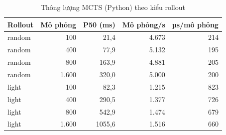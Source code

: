 \begin{table}[H]
  \centering
  \small
  \caption{Thông lượng MCTS (Python) theo kiểu rollout}
  \label{tab:cs-tk-mcts}
  \begin{tabular}{lrrrr}
    \toprule
    Rollout & Mô phỏng & P50 (ms) & Mô phỏng/s & µs/mô phỏng \\
    \midrule
    random & 100 & 21,4 & 4.673 & 214 \\
    random & 400 & 77,9 & 5.132 & 195 \\
    random & 800 & 163,9 & 4.881 & 205 \\
    random & 1.600 & 320,0 & 5.000 & 200 \\
    light & 100 & 82,3 & 1.215 & 823 \\
    light & 400 & 290,5 & 1.377 & 726 \\
    light & 800 & 542,9 & 1.474 & 679 \\
    light & 1.600 & 1055,6 & 1.516 & 660 \\
    \bottomrule
  \end{tabular}
\end{table}
